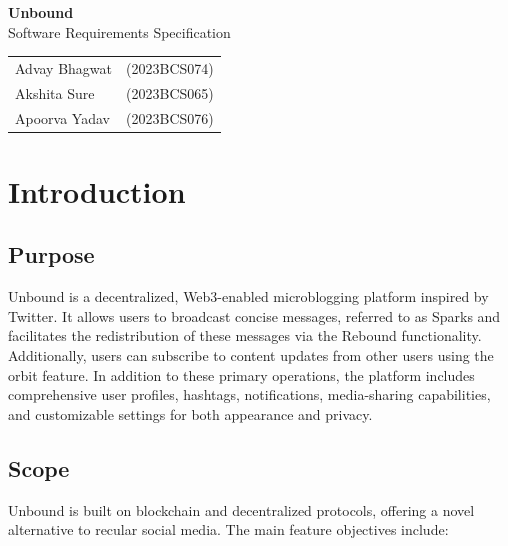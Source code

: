 \documentclass[a4paper,12pt]{article}
\newcommand{\toctarget}{\hypertarget{toc}{}}
\begin{document}
\begin{titlepage}
    \thispagestyle{empty} 
    
    \centering
    \vspace*{\fill}
    
    {\Huge \bfseries Unbound}\\[1cm]
    {\LARGE Software Requirements Specification}\\[2cm]
    \large \bfseries
    \begin{tabular}{l l}
        Advay Bhagwat  & (2023BCS074) \\
        Akshita Sure   & (2023BCS065) \\
        Apoorva Yadav  & (2023BCS076) \\
    \end{tabular}    
        \vspace*{\fill}
\end{titlepage}

\newpage
\thispagestyle{plain}

\toctarget
\tableofcontents

\newpage

\section{Introduction}

\subsection{Purpose}
Unbound is a decentralized, Web3-enabled microblogging platform inspired by Twitter. It allows users to broadcast concise messages, referred to as Sparks and facilitates the redistribution of these messages via the Rebound functionality. Additionally, users can subscribe to content updates from other users using the orbit feature. In addition to these primary operations, the platform includes comprehensive user profiles, hashtags, notifications, media-sharing capabilities, and customizable settings for both appearance and privacy.

\subsection{Scope}
Unbound is built on blockchain and decentralized protocols, offering a novel alternative to recular social media. The main feature objectives include:
\end{document}
